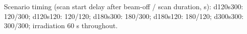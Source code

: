 Scenario timing (scan start delay after beam-off / scan duration, s): d120s300: 120/300; d120s120: 120/120; d180s300: 180/300; d180s120: 180/120; d300s300: 300/300; irradiation 60 s throughout.
